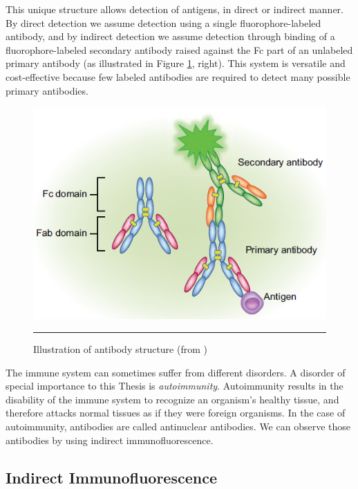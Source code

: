 This unique structure allows detection of antigens, in direct or indirect manner. By direct detection we assume detection using a single fluorophore-labeled antibody, and by indirect detection we assume detection through binding of a fluorophore-labeled secondary antibody raised against the Fc part of an unlabeled primary antibody (as illustrated in Figure \ref{fig:AntibodyIllustration}, right). This system is versatile and cost-effective because few labeled antibodies are required to detect many possible primary antibodies. \\


\begin{figure}[htbp]
	\centering
	\includegraphics[scale=0.5]{Figures/Domain/antibodies}
	\rule{35em}{0.5pt}
	\caption[Illustration of antibody structure]{Illustration of antibody structure (from \cite{OdellCook2013})}
	\label{fig:AntibodyIllustration}

\end{figure}

The immune system can sometimes suffer from different disorders. A disorder of special importance to this Thesis is  \textit{autoimmunity}. Autoimmunity results in the disability of the immune system to recognize an organism's healthy tissue, and therefore attacks normal tissues as if they were foreign organisms. In the case of autoimmunity, antibodies are called antinuclear antibodies. We can observe those antibodies by using indirect immunofluorescence. \\

\subsection{Indirect Immunofluorescence}

